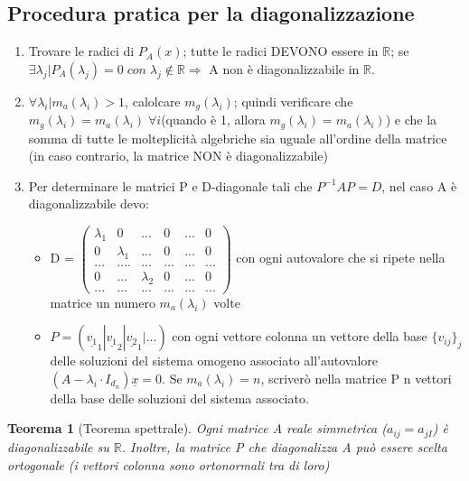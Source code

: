 \documentclass[12pt]{article}
\newenvironment{para}{\begin{adjustwidth}{13mm}{}}{\end{adjustwidth}}
\newtheorem{Teorema}{Teorema}[subsection]
\begin{document}
\begin{para}
\subsection{Procedura pratica per la diagonalizzazione}
\begin{enumerate}
    \item Trovare le radici di $P_A(x)$; tutte le radici DEVONO essere in $\mathbb{R}$; se $\exists \lambda_j | P_A(\lambda_j) = 0 \; con \; \lambda_j \notin \mathbb{R} \Rightarrow $ A non è diagonalizzabile in $\mathbb{R}$.
    \item $\forall \lambda_i | m_a(\lambda_i)>1$, calolcare $m_g(\lambda_i)$; quindi verificare che $m_g(\lambda_i) = m_a(\lambda_i) \; \forall i$(quando è 1, allora $m_g(\lambda_i) = m_a(\lambda_i)$) e che la somma di tutte le molteplicità algebriche sia uguale all'ordine della matrice (in caso contrario, la matrice NON è diagonalizzabile)
    \item Per determinare le matrici P e D-diagonale tali che $P^{-1}AP = D$, nel caso A è diagonalizzabile devo: \begin{itemize}
        \item D = $\begin{pmatrix}
            \lambda_1 & 0 & ... & 0 & ... & 0\\
            0 & \lambda_1 &...& 0 &...&0\\
            ...&....&...&... &...&...\\
            0  & ...& \lambda_2 & 0 &...&0 \\
            ...&...&...&...&...&...
        \end{pmatrix}$ \newline con ogni autovalore che si ripete nella matrice un numero $m_a(\lambda_i)$ volte
        \item $P = (\underline{v_1}_1 | \underline{v_1}_2 | \underline{v_2}_1 |...)$ con ogni vettore colonna un vettore della base $\{v_{ij}\}_j$ delle soluzioni del sistema omogeno associato all'autovalore \newline $(A-\lambda_i \cdot I_{d_n})\underline{x} = 0$. Se $m_a(\lambda_i) = n$, scriverò nella matrice P n vettori della base delle soluzioni del sistema associato.
    \end{itemize} 
\end{enumerate}
\begin{Teorema}[Teorema spettrale]
Ogni matrice A reale simmetrica ($a_{ij} = a_{jI}$) è diagonalizzabile su $\mathbb{R}$. Inoltre, la matrice P che diagonalizza A può essere scelta ortogonale (i vettori colonna sono ortonormali tra di loro)
\end{Teorema}
\newpage

\end{para}
\end{document}
